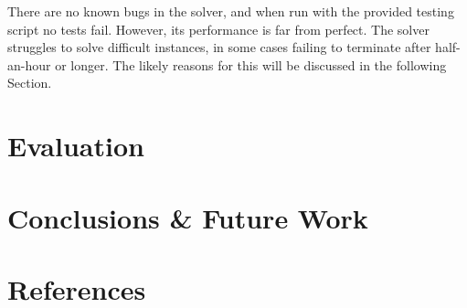 \documentclass[11pt]{article}
\begin{document}
		There are no known bugs in the solver, and when run with the provided testing script no tests fail.
		However, its performance is far from perfect.
		The solver struggles to solve difficult instances, in some cases failing to terminate after half-an-hour or longer.
		The likely reasons for this will be discussed in the following Section.

	\section{Evaluation}

	\section{Conclusions \& Future Work}



	\section{References}
	
	
\end{document}
